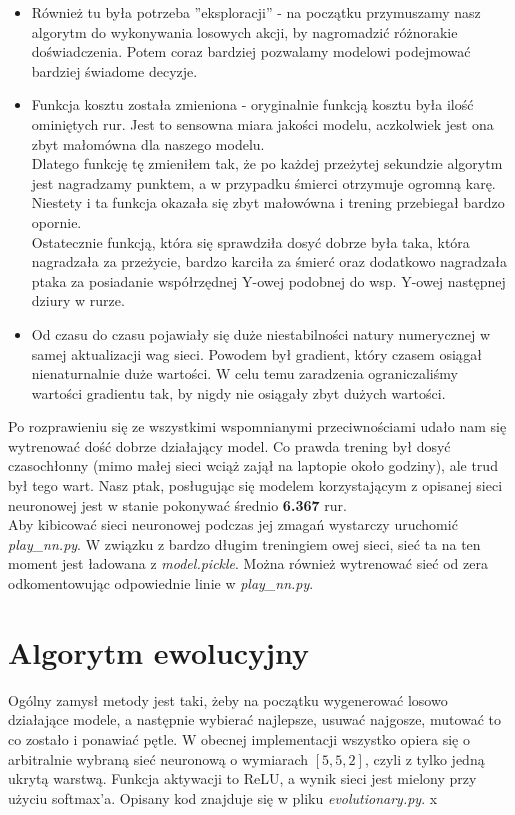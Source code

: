 \documentclass[12pt, A4]{article}
\begin{document}
	\begin{itemize}
	\item Również tu była potrzeba ''eksploracji'' - na początku przymuszamy nasz algorytm do wykonywania losowych akcji, by nagromadzić różnorakie doświadczenia. Potem coraz bardziej pozwalamy modelowi podejmować bardziej świadome decyzje.
	\item Funkcja kosztu została zmieniona - oryginalnie funkcją kosztu była ilość ominiętych rur. Jest to sensowna miara jakości modelu, aczkolwiek jest ona zbyt małomówna dla naszego modelu. \\
	Dlatego funkcję tę zmieniłem tak, że po każdej przeżytej sekundzie algorytm jest nagradzamy punktem, a w przypadku śmierci otrzymuje ogromną karę. Niestety i ta funkcja okazała się zbyt małowówna i trening przebiegał bardzo opornie. \\
	Ostatecznie funkcją, która się sprawdziła dosyć dobrze była taka, która nagradzała za przeżycie, bardzo karciła za śmierć oraz dodatkowo nagradzała ptaka za posiadanie współrzędnej Y-owej podobnej do wsp. Y-owej następnej dziury w rurze. 
	\item Od czasu do czasu pojawiały się duże niestabilności natury numerycznej w samej aktualizacji wag sieci. Powodem był gradient, który czasem osiągał nienaturnalnie duże wartości. W celu temu zaradzenia ograniczaliśmy wartości gradientu tak, by nigdy nie osiągały zbyt dużych wartości. 
	\end{itemize}
	Po rozprawieniu się ze wszystkimi wspomnianymi przeciwnościami udało nam się wytrenować dość dobrze działający model. Co prawda trening był dosyć czasochłonny (mimo małej sieci wciąż zajął na laptopie około godziny), ale trud był tego wart. Nasz ptak, posługując się modelem korzystającym z opisanej sieci neuronowej jest w stanie pokonywać średnio \textbf{6.367} rur. \\
	Aby kibicować sieci neuronowej podczas jej zmagań wystarczy uruchomić \textit{play\_nn.py}. W związku z bardzo długim treningiem owej sieci, sieć ta na ten moment jest ładowana z \textit{model.pickle}. Można również wytrenować sieć od zera odkomentowując odpowiednie linie w \textit{play\_nn.py}.

\section{Algorytm ewolucyjny}
Ogólny zamysł metody jest taki, żeby na początku wygenerować losowo działające modele, a następnie wybierać najlepsze, usuwać najgosze, mutować to co zostało i ponawiać pętle.
\newline
W obecnej implementacji wszystko opiera się o arbitralnie wybraną sieć neuronową o wymiarach $[5, 5, 2]$, czyli z tylko jedną ukrytą warstwą. Funkcja aktywacji to ReLU, a wynik sieci jest mielony przy użyciu softmax'a. Opisany kod znajduje się w pliku \textit{evolutionary.py}.
x
\end{document}
